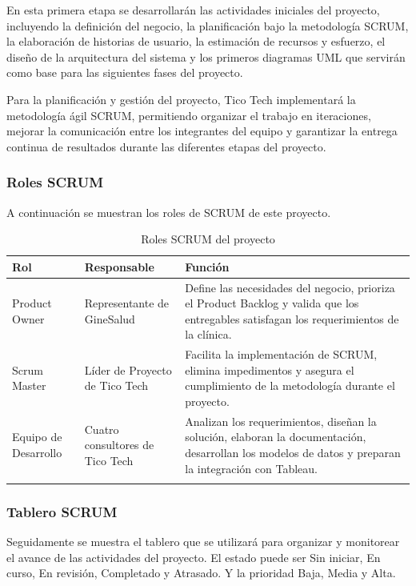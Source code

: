 \documentclass[12pt,letterpaper]{article}
\begin{document}
En esta primera etapa se desarrollarán las actividades iniciales del proyecto, incluyendo la
definición del negocio, la planificación bajo la metodología SCRUM, la elaboración de
historias de usuario, la estimación de recursos y esfuerzo, el diseño de la arquitectura del
sistema y los primeros diagramas UML que servirán como base para las siguientes fases
del proyecto.

Para la planificación y gestión del proyecto, Tico Tech implementará la metodología ágil
SCRUM, permitiendo organizar el trabajo en iteraciones, mejorar la comunicación entre los
integrantes del equipo y garantizar la entrega continua de resultados durante las diferentes
etapas del proyecto.

\subsubsection*{Roles SCRUM}

A continuación se muestran los roles de SCRUM de este proyecto.

\begin{xltabular}{\textwidth}{|p{2.8cm}|p{3.2cm}|X|}
\hline
{}
\textbf{Rol} & \textbf{Responsable} & \textbf{Función} \\
\hline
\endhead
Product Owner & Representante de GineSalud & Define las necesidades del negocio, prioriza el Product Backlog y valida que los entregables satisfagan los requerimientos de la clínica. \\
\hline
Scrum Master & Líder de Proyecto de Tico Tech & Facilita la implementación de SCRUM, elimina impedimentos y asegura el cumplimiento de la metodología durante el proyecto. \\
\hline
Equipo de Desarrollo & Cuatro consultores de Tico Tech & Analizan los requerimientos, diseñan la solución, elaboran la documentación, desarrollan los modelos de datos y preparan la integración con Tableau. \\
\hline
\caption{Roles SCRUM del proyecto}
\end{xltabular}

\subsubsection*{Tablero SCRUM}

Seguidamente se muestra el tablero que se utilizará para organizar y monitorear el avance
de las actividades del proyecto. El estado puede ser Sin iniciar, En curso, En revisión,
Completado y Atrasado. Y la prioridad Baja, Media y Alta.
\end{document}
